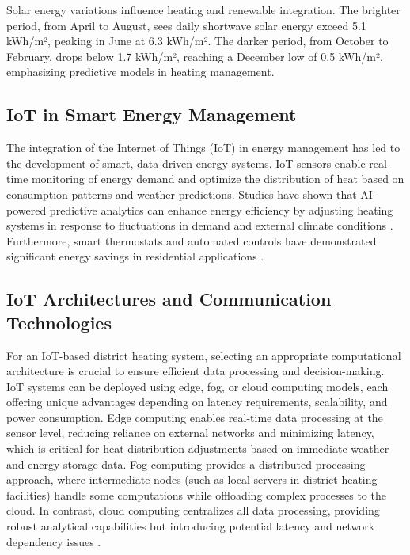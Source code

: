 \documentclass{article}
\begin{document}
Solar energy variations influence heating and renewable integration. The brighter period, from April to August, sees daily shortwave solar energy exceed 5.1 kWh/m², peaking in June at 6.3 kWh/m². The darker period, from October to February, drops below 1.7 kWh/m², reaching a December low of 0.5 kWh/m², emphasizing predictive models in heating management. \cite{weatherspark_assen}


\subsection{IoT in Smart Energy Management}
The integration of the Internet of Things (IoT) in energy management has led to the development of smart, data-driven energy systems. IoT sensors enable real-time monitoring of energy demand and optimize the distribution of heat based on consumption patterns and weather predictions\cite{smarthome_iot_big_data}. Studies have shown that AI-powered predictive analytics can enhance energy efficiency by adjusting heating systems in response to fluctuations in demand and external climate conditions \cite{ai_energy}. Furthermore, smart thermostats and automated controls have demonstrated significant energy savings in residential applications \cite{smart_heating}.

\subsection{IoT Architectures and Communication Technologies}

For an IoT-based district heating system, selecting an appropriate computational architecture is crucial to ensure efficient data processing and decision-making. IoT systems can be deployed using edge, fog, or cloud computing models\cite{s21175922}, each offering unique advantages depending on latency requirements, scalability, and power consumption. Edge computing enables real-time data processing at the sensor level, reducing reliance on external networks and minimizing latency, which is critical for heat distribution adjustments based on immediate weather and energy storage data. Fog computing provides a distributed processing approach, where intermediate nodes (such as local servers in district heating facilities) handle some computations while offloading complex processes to the cloud. In contrast, cloud computing centralizes all data processing, providing robust analytical capabilities but introducing potential latency and network dependency issues \cite{iot_architecture}. 
\end{document}
